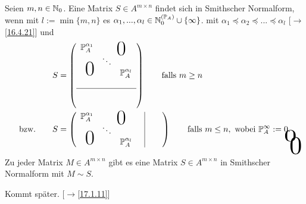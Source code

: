 \documentclass[../../main.tex]{subfiles}
\begin{document}
\begin{df}\label{17.1.2}
Seien $m,n\in \mathbb N_0$. Eine Matrix $S\in A^{m\times n}$ findet sich in Smithscher Normalform, wenn mit $l:=\min\{m,n\}$ es $\alpha_1,...,\alpha_l\in \mathbb N_0^{(\mathbb P_A)}\cup\{\infty\}$. mit $\alpha_1\preceq\alpha_2\preceq...\preceq\alpha_l$ [$\to$\ref{16.4.21}] und 
\begin{align*}
&S=\left(\begin{array}{c c c}
\P_A^{\alpha_1}& \multicolumn{2}{c}{\text{\kern 1em\smash{\raisebox{-1.5ex}{\Huge 0}}}} \\
& \ddots &  \\
\multicolumn{2}{c}{\text{\kern-1.5em\smash{\raisebox{0ex}{\Huge 0}}}} &\P_A^{\alpha_l}\\
& &\\
\hline 
&\tikz[remember picture]\node[inner sep=0pt] (a){ };&\\
& &
\end{array}\right)\qquad\text{falls }m\ge n\\
\text{bzw.}\qquad&S=\left(\begin{array}{c c c c|c c}
 \P_A^{\alpha_1}& \multicolumn{2}{c}{\text{\kern 1em\smash{\raisebox{-1.5ex}{\Huge 0}}}}& &\tikz[remember picture]\node[inner sep=0pt] (b){ }; &\\
& \ddots & & \\
\multicolumn{2}{c}{\text{\kern-1.5em\smash{\raisebox{0ex}{\Huge 0}}}}& \P_A^{\alpha_l}& &\\
\end{array}\right)\qquad\text{falls }m\le n,\text{ wobei } \P_A^\infty:=0. 
\begin{tikzpicture}[overlay, remember picture]
\node at (a.north) [anchor=center,yshift=-0.2cm, yscale=2,xscale=3] {$0$};
\node at (b.east) [anchor=center, xshift=0.2cm,yshift=-0.6cm,  xscale=3, yscale=3] {$0$};
\end{tikzpicture}
\end{align*}
\end{df}

\begin{sat}\label{17.1.3}
Zu jeder Matrix $M\in A^{m\times n}$ gibt es eine Matrix $S\in A^{m\times n}$ in Smithscher Normalform mit $M\sim S$.
\end{sat}
\begin{cproof}
Kommt später. [$\to$\ref{17.1.11}]
\end{cproof}
\end{document}
